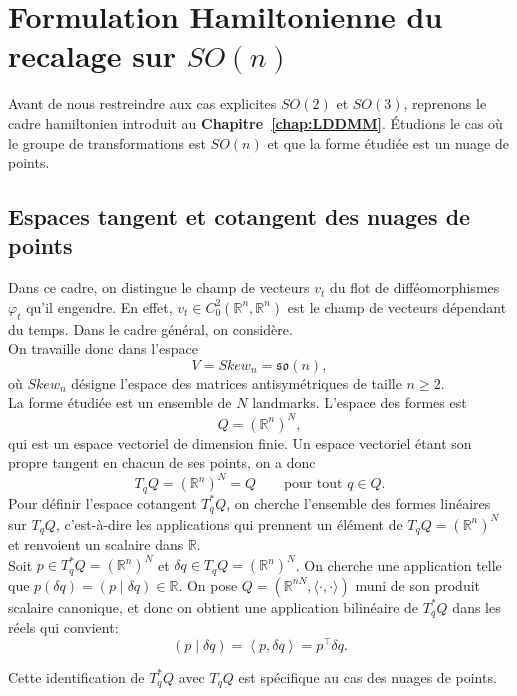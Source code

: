 \documentclass[12pt]{report}
\begin{document}
\chapter{Formulation Hamiltonienne du recalage sur \texorpdfstring{$SO(n)$}{SO (n)}}\label{chap:Hamiltonien}
Avant de nous restreindre aux cas explicites $SO(2)$ et $SO(3)$, reprenons le cadre hamiltonien introduit au \textbf{Chapitre~\ref{chap:LDDMM}}. Étudions le cas où le groupe de transformations est $SO(n)$ et que la forme étudiée est un nuage de points.


\section{Espaces tangent et cotangent des nuages de points}
Dans ce cadre, on distingue le champ de vecteurs $v_t$ du flot de difféomorphismes $\varphi_t$ qu'il engendre. En effet, $v_t\in C_0^2(\mathbb{R}^n,\mathbb{R}^n)$ est le champ de vecteurs dépendant du temps. Dans le cadre général, on considère.\\
On travaille donc dans l'espace
\[
V=Skew_n=\mathfrak{so}(n),
\]
où $Skew_n$ désigne l'espace des matrices antisymétriques de taille $n\geq 2$.\\
La forme étudiée est un ensemble de $N$ landmarks. L'espace des formes est
\[
Q={(\mathbb{R}^n)}^N,
\]
qui est un espace vectoriel de dimension finie. Un espace vectoriel étant son propre tangent en chacun de ses points, on a donc
\[
T_{q}Q={(\mathbb{R}^n)}^N=Q\qquad\text{pour tout }q\in Q.
\]
Pour définir l'espace cotangent $T_{q}^*Q$, on cherche l'ensemble des formes linéaires sur $T_{q}Q$, c'est-à-dire les applications qui prennent un élément de $T_{q}Q={(\mathbb{R}^n)}^N$ et renvoient un scalaire dans $\mathbb{R}$.\\
Soit $p\in T_{q}^*Q={(\mathbb{R}^n)}^N$ et $\delta q\in T_{q}Q={(\mathbb{R}^n)}^N$. On cherche une application telle que $p(\delta q)=(p\mid\delta q)\in\mathbb{R}$. On pose $Q=(\mathbb{R}^{nN}, \langle\cdot,\cdot\rangle)$ muni de son produit scalaire canonique, et donc on obtient une application bilinéaire de $T_{q}^*Q$ dans les réels qui convient:
\[
(p\mid\delta q)=\left\langle p,\delta q\right\rangle=p^{\top}\delta q.
\]
\begin{remark}
Cette identification de $T_{q}^*Q$ avec $T_{q}Q$ est spécifique au cas des nuages de points.
\end{remark}
\end{document}
